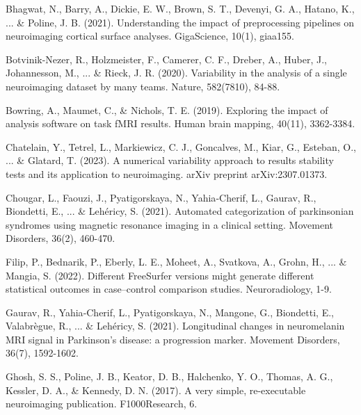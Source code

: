 Bhagwat, N., Barry, A., Dickie, E. W., Brown, S. T., Devenyi, G. A., Hatano, K., ... \& Poline, J. B. (2021). Understanding the impact of preprocessing pipelines on neuroimaging cortical surface analyses. GigaScience, 10(1), giaa155.


Botvinik-Nezer, R., Holzmeister, F., Camerer, C. F., Dreber, A., Huber, J., Johannesson, M., ... \& Rieck, J. R. (2020). Variability in the analysis of a single neuroimaging dataset by many teams. Nature, 582(7810), 84-88.

Bowring, A., Maumet, C., \& Nichols, T. E. (2019). Exploring the impact of analysis software on task fMRI results. Human brain mapping, 40(11), 3362-3384.

Chatelain, Y., Tetrel, L., Markiewicz, C. J., Goncalves, M., Kiar, G., Esteban, O., ... \& Glatard, T. (2023). A numerical variability approach to results stability tests and its application to neuroimaging. arXiv preprint arXiv:2307.01373.


Chougar, L., Faouzi, J., Pyatigorskaya, N., Yahia‐Cherif, L., Gaurav, R., Biondetti, E., ... \& Lehéricy, S. (2021). Automated categorization of parkinsonian syndromes using magnetic resonance imaging in a clinical setting. Movement Disorders, 36(2), 460-470.

Filip, P., Bednarik, P., Eberly, L. E., Moheet, A., Svatkova, A., Grohn, H., ... \& Mangia, S. (2022). Different FreeSurfer versions might generate different statistical outcomes in case–control comparison studies. Neuroradiology, 1-9.

Gaurav, R., Yahia‐Cherif, L., Pyatigorskaya, N., Mangone, G., Biondetti, E., Valabrègue, R., ... \& Lehéricy, S. (2021). Longitudinal changes in neuromelanin MRI signal in Parkinson's disease: a progression marker. Movement Disorders, 36(7), 1592-1602.

Ghosh, S. S., Poline, J. B., Keator, D. B., Halchenko, Y. O., Thomas, A. G., Kessler, D. A., \& Kennedy, D. N. (2017). A very simple, re-executable neuroimaging publication. F1000Research, 6.

